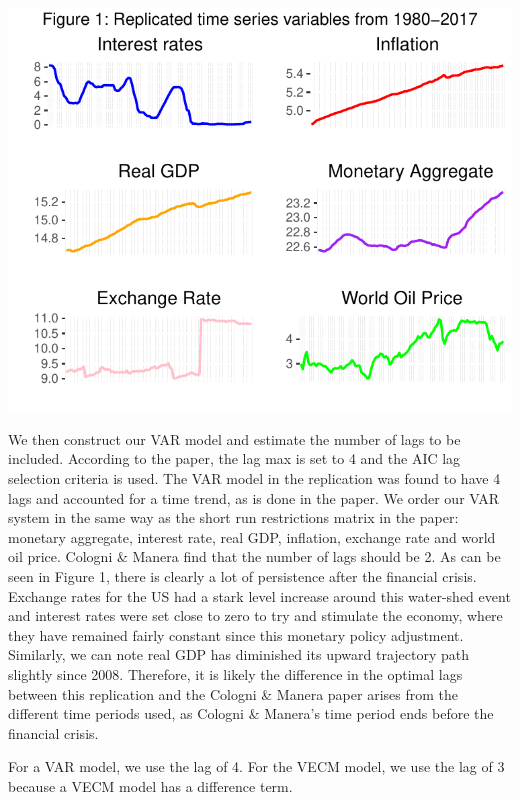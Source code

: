 \documentclass[11pt,preprint, authoryear]{elsarticle}
\numberwithin{equation}{section}
\numberwithin{figure}{section}
\numberwithin{table}{section}
\begin{document}
\begin{center}\includegraphics{README_files/figure-latex/unnamed-chunk-1-1} \end{center}

We then construct our VAR model and estimate the number of lags to be
included. According to the paper, the lag max is set to 4 and the AIC
lag selection criteria is used. The VAR model in the replication was
found to have 4 lags and accounted for a time trend, as is done in the
paper. We order our VAR system in the same way as the short run
restrictions matrix in the paper: monetary aggregate, interest rate,
real GDP, inflation, exchange rate and world oil price. Cologni \&
Manera find that the number of lags should be 2. As can be seen in
Figure 1, there is clearly a lot of persistence after the financial
crisis. Exchange rates for the US had a stark level increase around this
water-shed event and interest rates were set close to zero to try and
stimulate the economy, where they have remained fairly constant since
this monetary policy adjustment. Similarly, we can note real GDP has
diminished its upward trajectory path slightly since 2008. Therefore, it
is likely the difference in the optimal lags between this replication
and the Cologni \& Manera paper arises from the different time periods
used, as Cologni \& Manera's time period ends before the financial
crisis.

For a VAR model, we use the lag of 4. For the VECM model, we use the lag
of 3 because a VECM model has a difference term.
\end{document}
